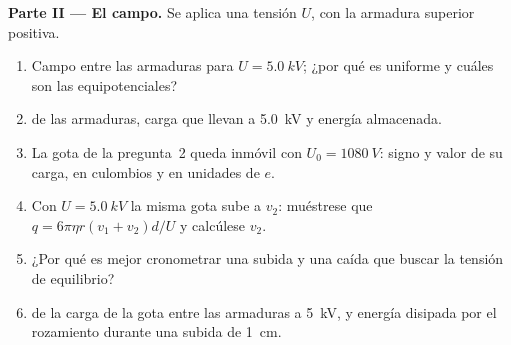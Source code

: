 \begin{problem}
\medskip
\noindent\textbf{Parte II --- El campo.}
Se aplica una tensión $U$, con la armadura superior positiva.
\begin{enumerate}[resume]
  \item Campo entre las armaduras para $U = \qty{5.0}{kV}$; ¿por qué es
        uniforme y cuáles son las equipotenciales?
  \item {} de las armaduras, carga que llevan a \qty{5.0}{kV} y
        energía almacenada.
  \item La gota de la pregunta~2 queda inmóvil con $U_0 = \qty{1080}{V}$:
        signo y valor de su carga, en culombios y en unidades de $e$.
  \item Con $U = \qty{5.0}{kV}$ la misma gota sube a $v_2$: muéstrese que
        $q = 6\pi\eta r(v_1 + v_2)d/U$ y calcúlese $v_2$.
  \item ¿Por qué es mejor cronometrar una subida y una caída que buscar la
        tensión de equilibrio?
  \item {} de la carga de la gota entre las armaduras a
        \qty{5}{kV}, y energía disipada por el rozamiento durante una
        subida de \qty{1}{cm}.
\end{enumerate}


\end{problem}
